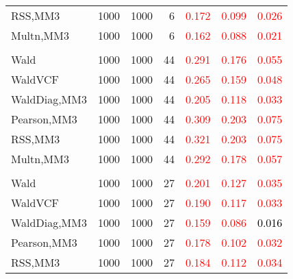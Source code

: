 \documentclass[
]{article}
\begin{document}
\begin{table}[H]
{\begin{tabular}[t]{lrrrrrr}
\hspace{1em}RSS,MM3 & 1000 & 1000 & 6 & \textcolor{red}{0.172} & \textcolor{red}{0.099} & \textcolor{red}{0.026}\\
\hspace{1em}Multn,MM3 & 1000 & 1000 & 6 & \textcolor{red}{0.162} & \textcolor{red}{0.088} & \textcolor{red}{0.021}\\
\addlinespace[0.3em]
\multicolumn{7}{l}{\textbf{1F 15V}}\\
\hspace{1em}Wald & 1000 & 1000 & 44 & \textcolor{red}{0.291} & \textcolor{red}{0.176} & \textcolor{red}{0.055}\\
\hspace{1em}WaldVCF & 1000 & 1000 & 44 & \textcolor{red}{0.265} & \textcolor{red}{0.159} & \textcolor{red}{0.048}\\
\hspace{1em}WaldDiag,MM3 & 1000 & 1000 & 44 & \textcolor{red}{0.205} & \textcolor{red}{0.118} & \textcolor{red}{0.033}\\
\hspace{1em}Pearson,MM3 & 1000 & 1000 & 44 & \textcolor{red}{0.309} & \textcolor{red}{0.203} & \textcolor{red}{0.075}\\
\hspace{1em}RSS,MM3 & 1000 & 1000 & 44 & \textcolor{red}{0.321} & \textcolor{red}{0.203} & \textcolor{red}{0.075}\\
\hspace{1em}Multn,MM3 & 1000 & 1000 & 44 & \textcolor{red}{0.292} & \textcolor{red}{0.178} & \textcolor{red}{0.057}\\
\addlinespace[0.3em]
\multicolumn{7}{l}{\textbf{2F 10V}}\\
\hspace{1em}Wald & 1000 & 1000 & 27 & \textcolor{red}{0.201} & \textcolor{red}{0.127} & \textcolor{red}{0.035}\\
\hspace{1em}WaldVCF & 1000 & 1000 & 27 & \textcolor{red}{0.190} & \textcolor{red}{0.117} & \textcolor{red}{0.033}\\
\hspace{1em}WaldDiag,MM3 & 1000 & 1000 & 27 & \textcolor{red}{0.159} & \textcolor{red}{0.086} & \textcolor{black}{0.016}\\
\hspace{1em}Pearson,MM3 & 1000 & 1000 & 27 & \textcolor{red}{0.178} & \textcolor{red}{0.102} & \textcolor{red}{0.032}\\
\hspace{1em}RSS,MM3 & 1000 & 1000 & 27 & \textcolor{red}{0.184} & \textcolor{red}{0.112} & \textcolor{red}{0.034}\\

\end{tabular}}
\end{table}
\end{document}
